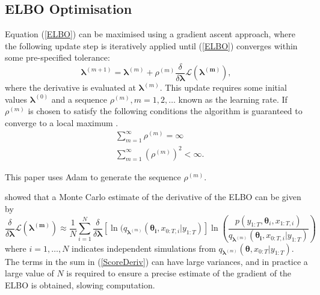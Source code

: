 \documentclass[12pt,a4paper]{article}%
\numberwithin{equation}{section}
\begin{document}
\subsection{ELBO Optimisation}
Equation (\ref{ELBO}) can be maximised using a gradient ascent approach, where the following update step is iteratively applied until (\ref{ELBO}) converges within some pre-specified tolerance:
\begin{equation}
\label{GradAscent}
\boldsymbol{\lambda}^{(m+1)} = \boldsymbol{\lambda}^{(m)} + \rho^{(m)} \frac{\delta}{\delta\boldsymbol{\lambda}} \mathcal{L}(\boldsymbol{\lambda^{(m)}}),
\end{equation}
where the derivative is evaluated at $\boldsymbol{\lambda}^{(m)}$. This update requires some initial values $\boldsymbol{\lambda}^{(0)}$ and a sequence $\rho^{(m)}, m = 1, 2, \dots$ known as the learning rate. If $\rho^{(m)}$ is chosen to satisfy the following conditions the algorithm is guaranteed to converge to a local maximum \citep{Robbins1951}.
\begin{align}
&\sum_{m=1}^{\infty} \rho^{(m)} =  \infty \\
&\sum_{m=1}^{\infty} (\rho^{(m)})^2 <  \infty.
\end{align}

This paper uses Adam \citep{Kingma2015b} to generate the sequence $\rho^{(m)}$.

\citet{Ranganath2014} showed that a Monte Carlo estimate of the derivative of the ELBO can be given by
\begin{equation}
\label{ScoreDeriv}
\frac{\delta}{\delta\boldsymbol{\lambda}}\mathcal{L}(\boldsymbol{\lambda^{(m)}}) \approx \frac{1}{N}\sum_{i=1}^{N} \frac{\delta}{\delta\boldsymbol{\lambda}} [\ln(q_{\boldsymbol{\lambda}^{(m)}}(\boldsymbol{\theta_i}, x_{0:T, i} | y_{1:T})] \ln \left(\frac{p(y_{1:T}, \boldsymbol{\theta}_i, x_{1:T, i})}{q_{\boldsymbol{\lambda}^{(m)}}(\boldsymbol{\theta_i}, x_{0:T, i} | y_{1:T})} \right) 
\end{equation}
where $i = 1, \dots, N$ indicates independent simulations from $q_{\boldsymbol{\lambda}^{(m)}}(\boldsymbol{\theta}, x_{0:T} | y_{1:T})$. 
The terms in the sum in (\ref{ScoreDeriv}) can have large variances, and in practice a large value of $N$ is required to ensure a precise estimate of the gradient of the ELBO is obtained, slowing computation. 
\end{document}
